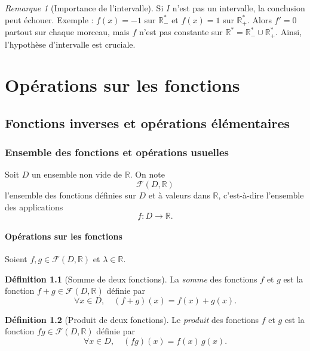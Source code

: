 \documentclass{report} %
\theoremstyle{definition}  %
\newtheorem{definition}{Définition}[chapter] %
\theoremstyle{plain} %
\theoremstyle{remark} %
\newtheorem*{remark}{Remarque} %
\begin{document}
\begin{remark}[Importance de l'intervalle]
Si \(I\) n'est pas un intervalle, la conclusion peut échouer.  
Exemple : \(f(x) = -1\) sur \(\mathbb{R}_-^*\) et \(f(x) = 1\) sur \(\mathbb{R}_+^*\).  
Alors \(f' = 0\) partout sur chaque morceau, mais \(f\) n'est pas constante sur \(\mathbb{R}^* = \mathbb{R}_-^* \cup \mathbb{R}_+^*\).  
Ainsi, l'hypothèse d'intervalle est cruciale.
\end{remark}





\chapter{\textbf{Opérations sur les fonctions}}


\section{\textbf{Fonctions inverses et opérations élémentaires}}


\subsection{Ensemble des fonctions et opérations usuelles}

Soit \(D\) un ensemble non vide de \(\mathbb{R}\).
On note
\[
\mathcal{F}(D,\mathbb{R})
\]
l’ensemble des fonctions définies sur \(D\) et à valeurs dans \(\mathbb{R}\), c’est-à-dire l’ensemble des applications
\[
f : D \to \mathbb{R}.
\]

\subsubsection{Opérations sur les fonctions}

Soient \(f,g \in \mathcal{F}(D,\mathbb{R})\) et \(\lambda \in \mathbb{R}\).

\begin{definition}[Somme de deux fonctions]
La \emph{somme} des fonctions \(f\) et \(g\) est la fonction \(f+g \in \mathcal{F}(D,\mathbb{R})\) définie par
\[
\forall x \in D, \quad (f+g)(x) = f(x) + g(x).
\]
\end{definition}

\begin{definition}[Produit de deux fonctions]
Le \emph{produit} des fonctions \(f\) et \(g\) est la fonction \(fg \in \mathcal{F}(D,\mathbb{R})\) définie par
\[
\forall x \in D, \quad (fg)(x) = f(x)\,g(x).
\]
\end{definition}
\end{document}
